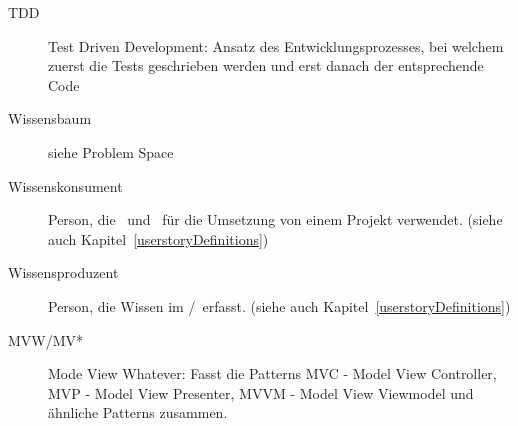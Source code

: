 \begin{description}
		\item[TDD]{Test Driven Development: Ansatz des Entwicklungsprozesses, bei welchem zuerst die Tests geschrieben werden und erst danach der entsprechende Code}
		\item[Wissensbaum]{siehe Problem Space}
		\item[Wissenskonsument]{Person, die \cdar\ und \eeppi\ für die Umsetzung von einem Projekt verwendet. (siehe auch Kapitel~\ref{userstoryDefinitions})}
		\item[Wissensproduzent]{Person, die Wissen im \cdar/\eeppi\ erfasst. (siehe auch Kapitel~\ref{userstoryDefinitions})}
		\item[MVW/MV*] Mode View Whatever: Fasst die Patterns MVC - Model View Controller, MVP - Model View Presenter, MVVM - Model View Viewmodel und ähnliche Patterns zusammen.
	\end{description}